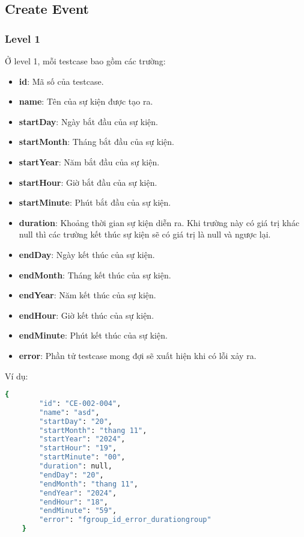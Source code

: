 \subsection{Create Event}
\subsubsection{Level 1}
Ở level 1, mỗi testcase bao gồm các trường:
\begin{itemize}
    \item \textbf{id}: Mã số của testcase.
    \item \textbf{name}: Tên của sự kiện được tạo ra.
    \item \textbf{startDay}: Ngày bắt đầu của sự kiện.
    \item \textbf{startMonth}: Tháng bắt đầu của sự kiện.
    \item \textbf{startYear}: Năm bắt đầu của sự kiện.
    \item \textbf{startHour}: Giờ bắt đầu của sự kiện.
    \item \textbf{startMinute}: Phút bắt đầu của sự kiện.
    \item \textbf{duration}: Khoảng thời gian sự kiện diễn ra. Khi trường này có giá trị khác null thì các trường kết thúc sự kiện sẽ có giá trị là null và ngược lại.
    \item \textbf{endDay}: Ngày kết thúc của sự kiện.
    \item \textbf{endMonth}: Tháng kết thúc của sự kiện.
    \item \textbf{endYear}: Năm kết thúc của sự kiện.
    \item \textbf{endHour}: Giờ kết thúc của sự kiện.
    \item \textbf{endMinute}: Phút kết thúc của sự kiện.
    \item \textbf{error}: Phần tử testcase mong đợi sẽ xuất hiện khi có lỗi xảy ra.
\end{itemize}

Ví dụ:
\begin{lstlisting}[language=bash, caption={Ví dụ testcase CE-002-004 ở level 1}]
    {
        "id": "CE-002-004",
        "name": "asd",
        "startDay": "20",
        "startMonth": "thang 11",
        "startYear": "2024",
        "startHour": "19",
        "startMinute": "00",
        "duration": null,
        "endDay": "20",
        "endMonth": "thang 11",
        "endYear": "2024",
        "endHour": "18",
        "endMinute": "59",
        "error": "fgroup_id_error_durationgroup"
    }
\end{lstlisting}
